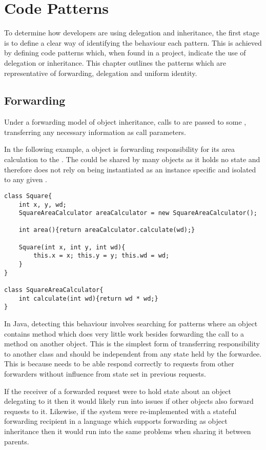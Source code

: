 \chapter{Code Patterns}\label{C:bg}
To determine how developers are using delegation and inheritance, the first stage is to define a clear way of identifying the behaviour each pattern. This is achieved by defining code patterns which, when found in a project, indicate the use of delegation or inheritance. This chapter outlines the patterns which are representative of forwarding, delegation and uniform identity.

\section{Forwarding}
Under a forwarding model of object inheritance, calls to  are passed to some , transferring any necessary information as call parameters.
\newline

In the following example, a  object is forwarding responsibility for its area calculation to the . The  could be shared by many  objects as it holds no state and therefore does not rely on being instantiated as an instance specific and isolated to any given .

\begin{lstlisting}
class Square{
	int x, y, wd;
	SquareAreaCalculator areaCalculator = new SquareAreaCalculator();

	int area(){return areaCalculator.calculate(wd);}

	Square(int x, int y, int wd){
		this.x = x; this.y = y; this.wd = wd;
	}
}

class SquareAreaCalculator{
	int calculate(int wd){return wd * wd;}
}
\end{lstlisting}

In Java, detecting this behaviour involves searching for patterns where an object contains method which does very little work besides forwarding the call to a method on another object. This is the simplest form of transferring responsibility to another class and should be independent from any state held by the forwardee. This is because needs to be able respond correctly to requests from other forwarders without influence from state set in previous requests.
\newline

If the receiver of a forwarded request were to hold state about an object delegating to it then it would likely run into issues if other objects also forward requests to it. Likewise, if the system were re-implemented with a stateful forwarding recipient in a language which supports forwarding as object inheritance then it would run into the same problems when sharing it between parents.

